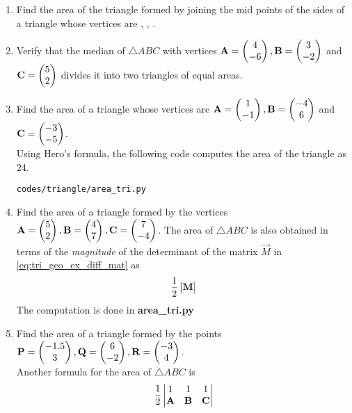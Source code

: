 \documentclass[journal,12pt,twocolumn]{IEEEtran}
\renewcommand\thesection{\arabic{section}}
\begin{document}
\begin{enumerate}[label=\thesection.\arabic*.,ref=\thesection.\theenumi]
\item Find the area of the triangle formed by joining the mid points of the sides of a triangle whose vertices are  ,  ,  .
\\
\solution
%
\item Verify that the median of $\triangle ABC$ with vertices $\mathbf{A}=\begin{pmatrix}4\\-6\end{pmatrix},  \mathbf{B}=\begin{pmatrix}3\\-2\end{pmatrix}$ and  $\mathbf{C} =  \begin{pmatrix}5\\2\end{pmatrix}$ divides it into two triangles of equal areas.
\\
\solution
%
\item Find the area of a triangle whose vertices are 
$\mathbf{A}=\begin{pmatrix}1\\-1\end{pmatrix}, 
\mathbf{B} = \begin{pmatrix}-4\\6\end{pmatrix}$ and
$ 
\mathbf{C} = \begin{pmatrix}-3\\-5\end{pmatrix}
$.
%
\\
\solution
  Using Hero's formula, the following code computes the area of the  triangle as 24.
%
\begin{lstlisting}
codes/triangle/area_tri.py
\end{lstlisting}
%
%
\item Find the area of a triangle formed by the vertices $\mathbf{A}=\begin{pmatrix}5\\2\end{pmatrix}, \mathbf{B}=\begin{pmatrix}4\\7\end{pmatrix}, \mathbf{C}=\begin{pmatrix}7\\-4\end{pmatrix}$.
\solution  The area of $\triangle ABC$ is also obtained  in terms of the  {\em magnitude} of the determinant of the matrix $\vec{M}$ in  \eqref{eq:tri_geo_ex_diff_mat} as
%
\begin{align}
\frac{1}{2}\begin{vmatrix}\mathbf{M}\end{vmatrix}
\end{align}
The computation is done in \textbf{area\_tri.py}
\item Find the area of a triangle formed by the points $\mathbf{P}=\begin{pmatrix}-1.5\\3\end{pmatrix}, \mathbf{Q}=\begin{pmatrix}6\\-2\end{pmatrix}, \mathbf{R}=\begin{pmatrix}-3\\4\end{pmatrix}$.
\\
\solution Another formula for the area of $\triangle ABC$  is
%
\begin{align}
\frac{1}{2}\mydet{1 & 1 & 1\\ \vec{A} & \vec{B} & \vec{C} }

\end{align}
\end{enumerate}
\end{document}
